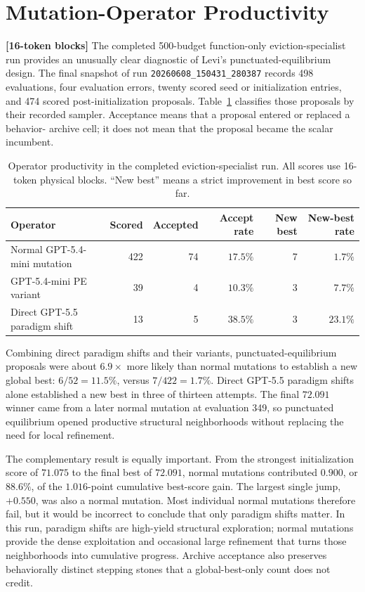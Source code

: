 \documentclass[11pt]{article}
\newcommand{\identifier}[1]{\nolinkurl{#1}}
\newcommand{\blocktag}[1]{\textbf{\color{navy}[#1-token blocks]}}
\begin{document}
\section{Mutation-Operator Productivity}
\label{sec:operator-productivity}

\blocktag{16} The completed 500-budget function-only eviction-specialist run provides
an unusually clear diagnostic of Levi's punctuated-equilibrium design.  The final
snapshot of run
\identifier{20260608_150431_280387} records 498 evaluations, four evaluation errors,
twenty scored seed or initialization entries, and 474 scored post-initialization
proposals.  Table~\ref{tab:operator-productivity} classifies those proposals by their
recorded sampler.  Acceptance means that a proposal entered or replaced a behavior-
archive cell; it does not mean that the proposal became the scalar incumbent.

\begin{table}[H]
\centering
\small
\begin{tabular}{lrrrrr}
\toprule
\textbf{Operator} & \textbf{Scored} & \textbf{Accepted} &
\textbf{Accept rate} & \textbf{New best} & \textbf{New-best rate} \\
\midrule
Normal GPT-5.4-mini mutation & 422 & 74 & \(17.5\%\) & 7 & \(1.7\%\) \\
GPT-5.4-mini PE variant & 39 & 4 & \(10.3\%\) & 3 & \(7.7\%\) \\
Direct GPT-5.5 paradigm shift & 13 & 5 & \(38.5\%\) & 3 & \(23.1\%\) \\
\bottomrule
\end{tabular}
\caption{Operator productivity in the completed eviction-specialist run.
All scores use 16-token physical blocks. ``New best'' means a strict improvement in
best score so far.}
\label{tab:operator-productivity}
\end{table}

Combining direct paradigm shifts and their variants, punctuated-equilibrium proposals
were about \(6.9\times\) more likely than normal mutations to establish a new global
best: \(6/52=11.5\%\), versus \(7/422=1.7\%\).  Direct GPT-5.5 paradigm shifts alone
established a new best in three of thirteen attempts.  The final \(72.091\) winner
came from a later normal mutation at evaluation 349, so punctuated equilibrium opened
productive structural neighborhoods without replacing the need for local refinement.

The complementary result is equally important.  From the strongest initialization
score of \(71.075\) to the final best of \(72.091\), normal mutations contributed
\(0.900\), or \(88.6\%\), of the \(1.016\)-point cumulative best-score gain.  The
largest single jump, \(+0.550\), was also a normal mutation.  Most individual normal
mutations therefore fail, but it would be incorrect to conclude that only paradigm
shifts matter.  In this run, paradigm shifts are high-yield structural exploration;
normal mutations provide the dense exploitation and occasional large refinement that
turns those neighborhoods into cumulative progress.  Archive acceptance also preserves
behaviorally distinct stepping stones that a global-best-only count does not credit.
\end{document}
